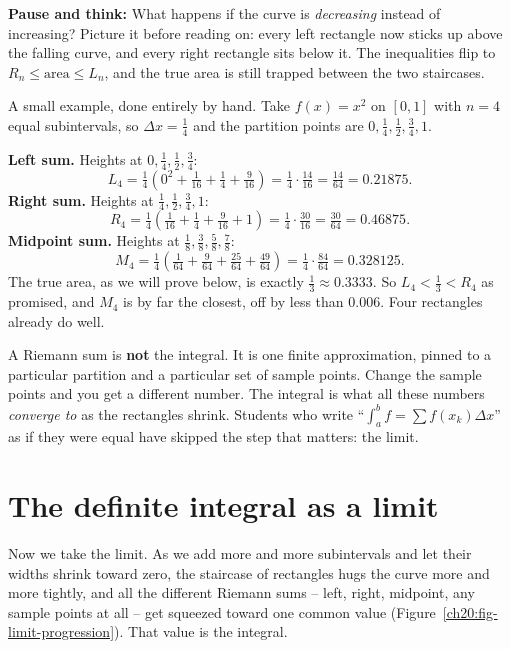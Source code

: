 \begin{recoverybox}
\textbf{Pause and think:} What happens if the curve is \emph{decreasing} instead of increasing? Picture it before reading on: every left rectangle now sticks up above the falling curve, and every right rectangle sits below it. The inequalities flip to $R_n \le \text{area} \le L_n$, and the true area is still trapped between the two staircases.
\end{recoverybox}

\begin{labbox}
A small example, done entirely by hand. Take
$f(x) = x^2$ on $[0,1]$ with $n = 4$ equal subintervals, so $\Delta x =
\tfrac14$ and the partition points are $0, \tfrac14, \tfrac12, \tfrac34, 1$.

\textbf{Left sum.} Heights at $0,\tfrac14,\tfrac12,\tfrac34$:
\[
  L_4 = \tfrac14\!\left(0^2 + \tfrac1{16} + \tfrac14 + \tfrac9{16}\right)
      = \tfrac14 \cdot \tfrac{14}{16} = \tfrac{14}{64} = 0.21875.
\]
\textbf{Right sum.} Heights at $\tfrac14,\tfrac12,\tfrac34,1$:
\[
  R_4 = \tfrac14\!\left(\tfrac1{16} + \tfrac14 + \tfrac9{16} + 1\right)
      = \tfrac14 \cdot \tfrac{30}{16} = \tfrac{30}{64} = 0.46875.
\]
\textbf{Midpoint sum.} Heights at $\tfrac18,\tfrac38,\tfrac58,\tfrac78$:
\[
  M_4 = \tfrac14\!\left(\tfrac1{64} + \tfrac9{64} + \tfrac{25}{64}
        + \tfrac{49}{64}\right) = \tfrac14 \cdot \tfrac{84}{64} = 0.328125.
\]
The true area, as we will prove below, is exactly $\tfrac13 \approx 0.3333$.
So $L_4 < \tfrac13 < R_4$ as promised, and $M_4$ is by far the closest,
off by less than $0.006$. Four rectangles already do well.
\end{labbox}

\begin{trapbox}
A Riemann sum is \textbf{not} the integral. It is one finite approximation,
pinned to a particular partition and a particular set of sample points. Change
the sample points and you get a different number. The integral is what all these
numbers \emph{converge to} as the rectangles shrink. Students who write
``$\int_a^b f = \sum f(x_k)\Delta x$'' as if they were equal have skipped the
step that matters: the limit.
\end{trapbox}

\section{The definite integral as a limit}
\label{ch20:def-integral}

Now we take the limit. As we add more and more subintervals and let their widths
shrink toward zero, the staircase of rectangles hugs the curve more and more
tightly, and all the different Riemann sums -- left, right, midpoint, any sample
points at all -- get squeezed toward one common value
(Figure~\ref{ch20:fig-limit-progression}). That value is the integral.

